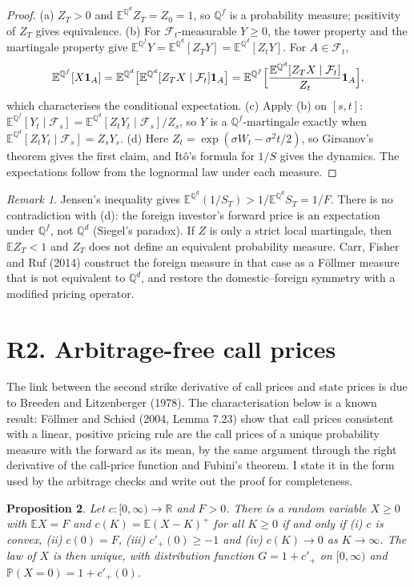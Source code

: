 \documentclass[11pt]{article}
\newtheorem{proposition}{Proposition}
\theoremstyle{remark}
\newtheorem{remark}[proposition]{Remark}
\newcommand{\E}{\mathbb{E}}
\newcommand{\Q}{\mathbb{Q}}
\renewcommand{\P}{\mathbb{P}}
\begin{document}
\begin{proof}
(a) $Z_T>0$ and $\E^{\Q^d}Z_T=Z_0=1$, so $\Q^f$ is a probability measure; positivity of $Z_T$ gives equivalence. (b) For $\mathcal F_t$-measurable $Y\ge0$, the tower property and the martingale property give $\E^{\Q^f}Y=\E^{\Q^d}[Z_TY]=\E^{\Q^d}[Z_tY]$. For $A\in\mathcal F_t$,
\[
\E^{\Q^f}[X\mathbf 1_A]=\E^{\Q^d}\bigl[\E^{\Q^d}[Z_TX\mid\mathcal F_t]\mathbf 1_A\bigr]=\E^{\Q^f}\Bigl[\frac{\E^{\Q^d}[Z_TX\mid\mathcal F_t]}{Z_t}\mathbf 1_A\Bigr],
\]
which characterises the conditional expectation. (c) Apply (b) on $[s,t]$: $\E^{\Q^f}[Y_t\mid\mathcal F_s]=\E^{\Q^d}[Z_tY_t\mid\mathcal F_s]/Z_s$, so $Y$ is a $\Q^f$-martingale exactly when $\E^{\Q^d}[Z_tY_t\mid\mathcal F_s]=Z_sY_s$. (d) Here $Z_t=\exp(\sigma W_t-\sigma^2t/2)$, so Girsanov's theorem gives the first claim, and It\^o's formula for $1/S$ gives the dynamics. The expectations follow from the lognormal law under each measure.
\end{proof}

\begin{remark}
Jensen's inequality gives $\E^{\Q^d}(1/S_T)>1/\E^{\Q^d}S_T=1/F$. There is no contradiction with (d): the foreign investor's forward price is an expectation under $\Q^f$, not $\Q^d$ (Siegel's paradox). If $Z$ is only a strict local martingale, then $\E Z_T<1$ and $Z_T$ does not define an equivalent probability measure. Carr, Fisher and Ruf (2014) construct the foreign measure in that case as a F\"ollmer measure that is not equivalent to $\Q^d$, and restore the domestic--foreign symmetry with a modified pricing operator.
\end{remark}

\section*{R2. Arbitrage-free call prices}

The link between the second strike derivative of call prices and state prices is due to Breeden and Litzenberger (1978). The characterisation below is a known result: F\"ollmer and Schied (2004, Lemma 7.23) show that call prices consistent with a linear, positive pricing rule are the call prices of a unique probability measure with the forward as its mean, by the same argument through the right derivative of the call-price function and Fubini's theorem. I state it in the form used by the arbitrage checks and write out the proof for completeness.

\begin{proposition}
Let $c:[0,\infty)\to\mathbb{R}$ and $F>0$. There is a random variable $X\ge 0$ with $\E X=F$ and $c(K)=\E(X-K)^+$ for all $K\ge0$ if and only if (i) $c$ is convex, (ii) $c(0)=F$, (iii) $c'_+(0)\ge -1$ and (iv) $c(K)\to0$ as $K\to\infty$. The law of $X$ is then unique, with distribution function $G=1+c'_+$ on $[0,\infty)$ and $\P(X=0)=1+c'_+(0)$.
\end{proposition}
\end{document}
